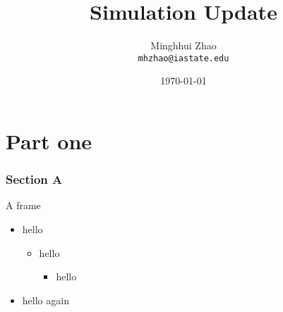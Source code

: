 \documentclass{beamer}
\title{Simulation Update}
\institute{ISU \& BNL}
\date[]{\today}
\author[M.H Zhao]{Minghhui Zhao\\\texttt{mhzhao@iastate.edu}}
\begin{document}
\begin{frame}
\titlepage
\end{frame}

\part{Part one}
\section{Section A}
\begin{frame}{A frame}
\begin{itemize}
\item hello
\begin{itemize}
\item hello
\begin{itemize}
\item hello
\end{itemize}
\end{itemize}
\item hello again
\end{itemize}
\end{frame}
\end{document}
